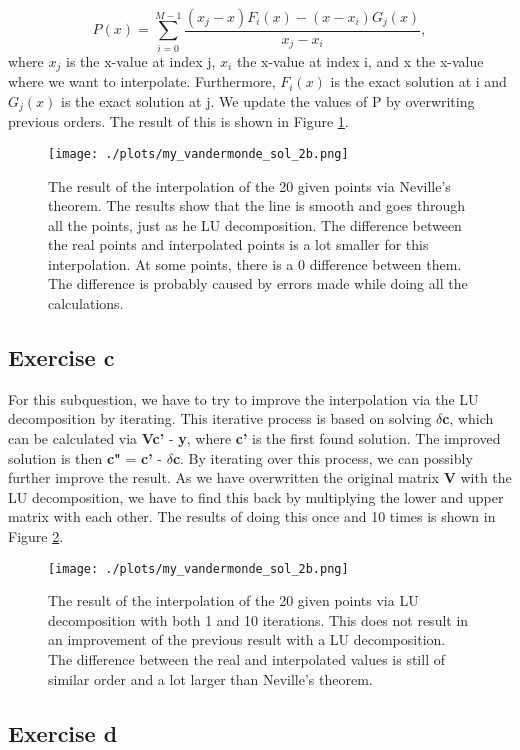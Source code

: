 \begin{equation}
    P(x) = \sum^{M-1}_{i=0}{\frac{(x_j - x)F_i(x) - (x-x_i)G_j(x)}{x_j-x_i}},
\end{equation}
where $x_j$ is the x-value at index j, $x_i$ the x-value at index i, and x the x-value where we want to interpolate. Furthermore, $F_i(x)$ is the exact solution at i and $G_j(x)$ is the exact solution at j. We update the values of P by overwriting previous orders. The result of this is shown in Figure \ref{fig:2b}.

\begin{figure}[h!]
  \centering
  \texttt{[image: ./plots/my\_vandermonde\_sol\_2b.png]}
  \caption{The result of the interpolation of the 20 given points via Neville's theorem. The results show that the line is smooth and goes through all the points, just as he LU decomposition. The difference between the real points and interpolated points is a lot smaller for this interpolation. At some points, there is a 0 difference between them. The difference is probably caused by errors made while doing all the calculations.}
  \label{fig:2b}
\end{figure}

\subsection{Exercise c}
For this subquestion, we have to try to improve the interpolation via the LU decomposition by iterating. This iterative process is based on solving \textbf{$\delta$c}, which can be calculated via \textbf{Vc'} - \textbf{y}, where \textbf{c'} is the first found solution. The improved solution is then \textbf{c"} = \textbf{c'} - \textbf{$\delta$c}. By iterating over this process, we can possibly further improve the result. As we have overwritten the original matrix \textbf{V} with the LU decomposition, we have to find this back by multiplying the lower and upper matrix with each other. The results of doing this once and 10 times is shown in Figure \ref{fig:2c}.

\begin{figure}[h!]
  \centering
  \texttt{[image: ./plots/my\_vandermonde\_sol\_2b.png]}
  \caption{The result of the interpolation of the 20 given points via LU decomposition with both 1 and 10 iterations. This does not result in an improvement of the previous result with a LU decomposition. The difference between the real and interpolated values is still of similar order and a lot larger than Neville's theorem.}
  \label{fig:2c}
\end{figure}

\subsection{Exercise d}


